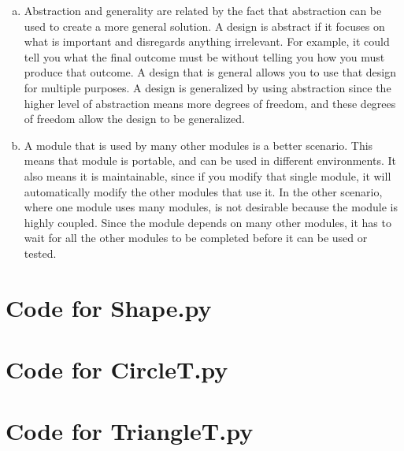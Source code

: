 \documentclass[12pt]{article}
\begin{document}
\begin{enumerate}[a)]
\item Abstraction and generality are related by the fact that abstraction can be used to create a more general solution. A design is abstract if it focuses on what is important and disregards anything irrelevant. For example, it could tell you what the final outcome must be without telling you how you must produce that outcome. A design that is general allows you to use that design for multiple purposes. A design is generalized by using abstraction since the higher level of abstraction means more degrees of freedom, and these degrees of freedom allow the design to be generalized.

\item A module that is used by many other modules is a better scenario. This means that module is portable, and can be used in different environments. It also means it is maintainable, since if you modify that single module, it will automatically modify the other modules that use it. In the other scenario, where one module uses many modules, is not desirable because the module is highly coupled. Since the module depends on many other modules, it has to wait for all the other modules to be completed before it can be used or tested.

\end{enumerate}

\newpage

\lstset{language=Python, basicstyle=\tiny, breaklines=true, showspaces=false,
  showstringspaces=false, breakatwhitespace=true}

\def\thesection{\Alph{section}}

\section{Code for Shape.py}

\noindent 

\newpage

\section{Code for CircleT.py}

\noindent 

\newpage

\section{Code for TriangleT.py}
\end{document}

